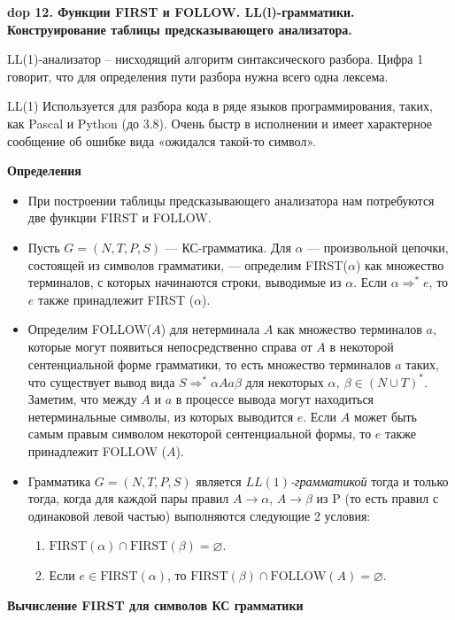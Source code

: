 \textbf{\LARGE dop 12. Функции FIRST и FOLLOW. LL(l)-грамматики. Конструирование таблицы предсказывающего анализатора.}

LL(1)-анализатор -- нисходящий алгоритм синтаксического разбора. Цифра 1 говорит, что для определения пути разбора нужна всего одна лексема.

LL(1) Используется для разбора кода в ряде языков программирования, таких, как Pascal и Python (до 3.8). Очень быстр в исполнении и имеет характерное сообщение об ошибке вида «ожидался такой-то символ».

\textbf{Определения}
\begin{itemize}
    \item При построении таблицы предсказывающего анализатора нам потребуются две функции FIRST и FOLLOW.
    \item Пусть $G = (N, T, P, S)$ --- КС-грамматика. 
    Для $\alpha$ --- произвольной цепочки, состоящей из символов грамматики, --- определим FIRST($\alpha$) как множество терминалов, с которых начинаются строки, выводимые из $\alpha$. 
    Если $\alpha \Rightarrow^\ast e$, то $e$ также принадлежит FIRST ($\alpha$).
    \item Определим FOLLOW($A$) для нетерминала $A$ как множество терминалов $a$, которые могут появиться непосредственно справа от $A$ в некоторой сентенциальной форме грамматики, то есть множество терминалов $a$ таких, что существует вывод вида $S \Rightarrow^\ast \alpha A a \beta$ для некоторых $\alpha,~\beta \in (N \cup T)^\ast$.
    Заметим, что между $A$ и $a$ в процессе вывода могут находиться нетерминальные символы, из которых выводится $e$. 
    Если $A$ может быть самым правым символом некоторой сентенциальной формы, то $e$ также принадлежит FOLLOW ($A$).
    \item Грамматика $G = (N, T, P, S)$ является \textit{$LL(1)$-грамматикой} тогда и только тогда, когда для каждой пары правил $A \rightarrow \alpha$, $A \rightarrow \beta$ из P (то есть правил с одинаковой левой частью) выполняются следующие 2 условия:
    \begin{enumerate}
        \item $\text{FIRST}(\alpha) \cap \text{FIRST}(\beta) = \varnothing$.
        \item Если $e \in \text{FIRST}(\alpha)$, то $\text{FIRST}(\beta) \cap \text{FOLLOW}(A) = \varnothing$.
    \end{enumerate}
\end{itemize}

\textbf{Вычисление FIRST для символов КС грамматики}

